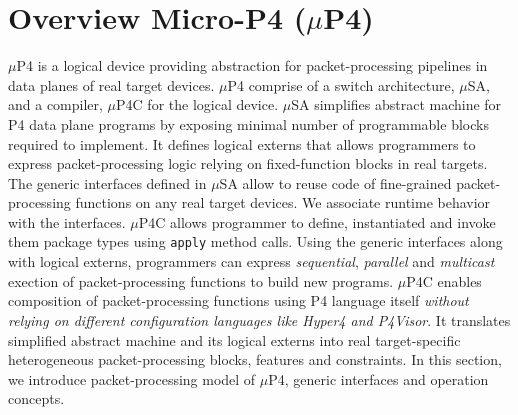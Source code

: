 \documentclass{hotnets19}
\newcommand{\hs}[1]{{\color{blue}{HS:#1}}}
\begin{document}




\section{Overview Micro-P4 \;($\mu$P4)}

$\mu$P4 is a logical device providing abstraction for packet-processing pipelines in data planes of real target devices.
$\mu$P4 comprise of a switch architecture, $\mu$SA, and a compiler, $\mu$P4C for the logical device. 
$\mu$SA simplifies abstract machine for P4 data plane programs by exposing minimal number of programmable blocks required to implement.
It defines logical externs that allows programmers to express packet-processing logic relying on fixed-function blocks in real targets.
The generic interfaces defined in $\mu$SA allow to reuse code of fine-grained packet-processing functions on any real target devices.
We associate runtime behavior with the interfaces.
$\mu$P4C allows programmer to define, instantiated and invoke them package types using \texttt{apply} method calls.
Using the generic interfaces along with logical externs, programmers can express \emph{sequential}, \emph{parallel} and \emph{multicast} exection of packet-processing functions to build new programs.
$\mu$P4C enables composition of packet-processing functions using P4 language itself \hs{in related work}\emph{without relying on different configuration languages like Hyper4 and P4Visor}.
It translates simplified abstract machine and its logical externs into real target-specific heterogeneous packet-processing blocks, features and constraints.
In this section, we introduce packet-processing model of $\mu$P4, generic interfaces and operation concepts.
\end{document}

